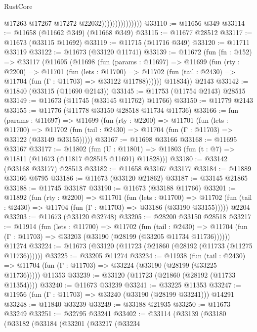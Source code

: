 \begin{lexlean}{RustCore}
\begin{coremodule}
                                  @17263
                                  @17267
                                  @17272
                                  @22032)))))))))))))))
@33110 := @11656 @349
@33114 := @11658 (@11662 @349) (@11668 @349)
@33115 := @11677 @28512
@33117 := @11673 (@33115 @11692)
@33119 := @11715 (@11716 @349)
@33120 := @11711 @33119
@33122 := @11673 (@33120 @11741)
@33139 := @11672
    (fun (fn : @152) =>
    @33117
      (@11695
        (@11698
          (fun (params : @11697) =>
          @11699
            (fun (rty : @2200) =>
            @11701
              (fun (lets : @11700) =>
              @11702 (fun (tail : @2430) => @11704 (fun (Γ : @11703) => @33122 @11788))))))
        @11834))
    @2143
@33142 := @11840 (@33115 (@11690 @2143))
@33145 := @11753 (@11754 @2143) @28515
@33149 := @11673 (@11745 (@33145 @11762) @11766)
@33150 := @11779 @2143
@33155 := @11776 (@11778 @33150 @28518 @11734 @11736)
@33166 := fun (params : @11697) =>
  @11699
    (fun (rty : @2200) =>
    @11701
      (fun (lets : @11700) =>
      @11702 (fun (tail : @2430) => @11704 (fun (Γ : @11703) => @33122 (@33149 @33155)))))
@33167 := @11698 @33166
@33168 := @11695 @33167
@33177 := @11802
    (fun (U : @11801) => @11803 (fun (t : @7) => @11811 (@11673 (@11817 @28515 @11691) @11828)))
@33180 := @33142 (@33168 @33177) @28513
@33182 := @11658 @33167 @33177
@33184 := @11889 @33166 @6795
@33186 := @11673 (@33120 @21862)
@33187 := @33145 @21865
@33188 := @11745 @33187
@33190 := @11673 (@33188 @11766)
@33201 := @11892
    (fun (rty : @2200) =>
    @11701
      (fun (lets : @11700) =>
      @11702 (fun (tail : @2430) => @11704 (fun (Γ : @11703) => @33186 (@33190 @33155)))))
    @2204
@33203 := @11673 (@33120 @32748)
@33205 := @28200 @33150 @28518
@33217 := @11914
    (fun (lets : @11700) =>
    @11702
      (fun (tail : @2430) =>
      @11704 (fun (Γ : @11703) => @33203 (@33190 (@28199 (@33205 @11734 @11736))))))
    @11274
@33224 := @11673 (@33120 (@11723 (@21860 (@28192 (@11733 (@11275 @11736))))))
@33225 := @33205 @11274
@33234 := @11938
    (fun (tail : @2430) => @11704 (fun (Γ : @11703) => @33224 (@33190 (@28199 (@33225 @11736)))))
    @11353
@33239 := @33120 (@11723 (@21860 (@28192 (@11733 @11354))))
@33240 := @11673 @33239
@33241 := @33225 @11353
@33247 := @11956 (fun (Γ : @11703) => @33240 (@33190 (@28199 @33241))) @14291
@33248 := @11840 @33239
@33249 := @33188 @21935
@33250 := @11673 @33249
@33251 := @32795 @33241
@33402 := @33114
    (@33139
      (@33180
        (@33182
          (@33184
            (@33201
              (@33217
                (@33234

\end{coremodule}
\end{lexlean}
